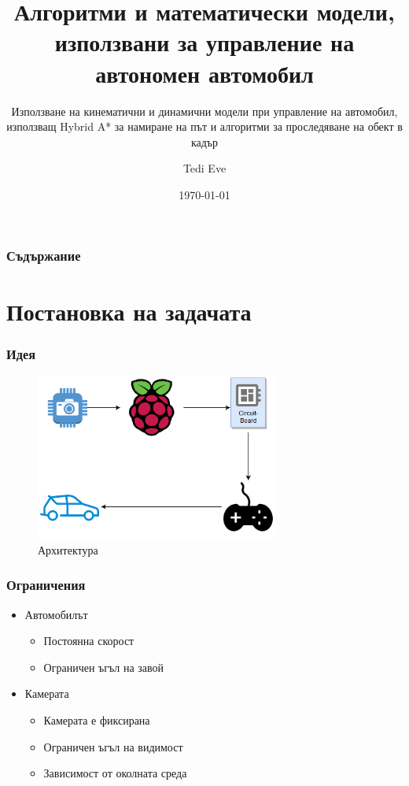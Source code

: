 \documentclass[hyperref=unicode]{beamer}
\title[Автономен автомобил]
{Алгоритми и математически модели, използвани за управление на автономен автомобил}
\subtitle{Използване на кинематични и динамични модели при управление на автомобил, използващ Hybrid A* за намиране на път и алгоритми за проследяване на обект в кадър}
\author
{Tedi Eve}
\institute[Hack]
{
  Hackathon Dream Team v1.0
}
\date{\today}
\begin{document}
  \frame{\titlepage}
  \begin{frame}
    \frametitle{Съдържание}
    \tableofcontents[currentsubsection]
  \end{frame}
\section{Постановка на задачата}
    \begin{frame}
      \frametitle{Идея}
      \begin{figure}
        \includegraphics[width=80mm]{SeminarIMMM.png}
        \caption{Архитектура}
        \label{fig:arch}
      \end{figure}
    \end{frame}
    \begin{frame}
      \frametitle{Ограничения}
      \begin{itemize}
        \item{Автомобилът}
          \begin{itemize}
            \item{Постоянна скорост}
            \item{Ограничен ъгъл на завой}
          \end{itemize}
        \item{Камерата}
          \begin{itemize}
            \item{Камерата е фиксирана}
            \item{Ограничен ъгъл на видимост}
            \item{Зависимост от околната среда}
          \end{itemize}
      \end{itemize}
    \end{frame}
\end{document}
